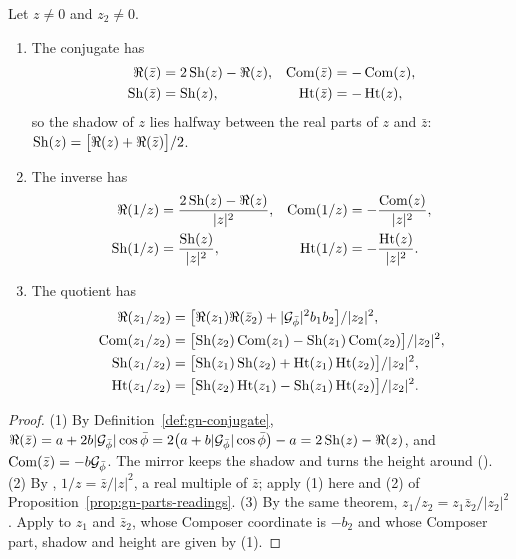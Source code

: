\begin{proposition}\label{prop:gn-parts-conjugate}
Let $z \neq 0$ and $z_2 \neq 0$.
\begin{enumerate}
  \item The conjugate has
  \begin{align*}
  \Re(\bar{z}) &= 2\operatorname{Sh}(z) - \Re(z) , & \operatorname{Com}(\bar{z}) &= -\operatorname{Com}(z) , \\
  \operatorname{Sh}(\bar{z}) &= \operatorname{Sh}(z) , & \operatorname{Ht}(\bar{z}) &= -\operatorname{Ht}(z) ,
  \end{align*}
  so the shadow of $z$ lies halfway between the real parts of $z$ and $\bar{z}$: $\operatorname{Sh}(z) = \bigl[\Re(z) + \Re(\bar{z})\bigr]/2$.
  \item The inverse has
  \begin{align*}
  \Re(1/z) &= \frac{2\operatorname{Sh}(z) - \Re(z)}{|z|^2} , & \operatorname{Com}(1/z) &= -\frac{\operatorname{Com}(z)}{|z|^2} , \\
  \operatorname{Sh}(1/z) &= \frac{\operatorname{Sh}(z)}{|z|^2} , & \operatorname{Ht}(1/z) &= -\frac{\operatorname{Ht}(z)}{|z|^2} .
  \end{align*}
  \item The quotient has
  \begin{align*}
  \Re(z_1/z_2) &= \bigl[\Re(z_1)\Re(\bar{z}_2) + |\mathcal{G}_{\bar{\phi}}|^2 b_1b_2\bigr]/|z_2|^2 , \\
  \operatorname{Com}(z_1/z_2) &= \bigl[\operatorname{Sh}(z_2)\operatorname{Com}(z_1) - \operatorname{Sh}(z_1)\operatorname{Com}(z_2)\bigr]/|z_2|^2 , \\
  \operatorname{Sh}(z_1/z_2) &= \bigl[\operatorname{Sh}(z_1)\operatorname{Sh}(z_2) + \operatorname{Ht}(z_1)\operatorname{Ht}(z_2)\bigr]/|z_2|^2 , \\
  \operatorname{Ht}(z_1/z_2) &= \bigl[\operatorname{Sh}(z_2)\operatorname{Ht}(z_1) - \operatorname{Sh}(z_1)\operatorname{Ht}(z_2)\bigr]/|z_2|^2 .
  \end{align*}
\end{enumerate}
\end{proposition}

\begin{proof}
(1) By Definition~\ref{def:gn-conjugate}, $\Re(\bar{z}) = a + 2b|\mathcal{G}_{\bar{\phi}}|\cos\bar{\phi} = 2\bigl(a + b|\mathcal{G}_{\bar{\phi}}|\cos\bar{\phi}\bigr) - a = 2\operatorname{Sh}(z) - \Re(z)$, and $\operatorname{Com}(\bar{z}) = -b\mathcal{G}_{\bar{\phi}}$. The mirror keeps the shadow and turns the height around (). (2) By , $1/z = \bar{z}/|z|^2$, a real multiple of $\bar{z}$; apply (1) here and (2) of Proposition~\ref{prop:gn-parts-readings}. (3) By the same theorem, $z_1/z_2 = z_1\bar{z}_2/|z_2|^2$. Apply  to $z_1$ and $\bar{z}_2$, whose Composer coordinate is $-b_2$ and whose Composer part, shadow and height are given by (1).
\end{proof}


